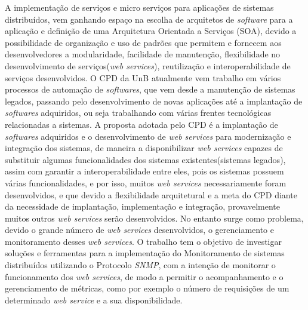 A implementação de serviços e micro serviços para aplicações de sistemas distribuídos, vem ganhando espaço na escolha de arquitetos de \textit{software} para a aplicação e definição de uma Arquitetura Orientada a Serviços (\acrshort{SOA}), devido a possibilidade de organização e uso de padrões que permitem e fornecem aos desenvolvedores a modularidade, facilidade de manutenção, flexibilidade no desenvolvimento de serviços(\textit{web services}), reutilização e interoperabilidade de serviços desenvolvidos. O \acrfull{CPD} da \acrfull{UnB} atualmente vem trabalho em vários processos de automação de \textit{softwares}, que vem desde a manutenção de sistemas legados, passando pelo desenvolvimento de novas aplicações até a implantação de \textit{softwares} adquiridos, ou seja trabalhando com várias frentes tecnológicas relacionadas a sistemas. A proposta adotada pelo \acrshort{CPD} é a implantação de \textit{softwares} adquiridos e o desenvolvimento de \textit{web services} para modernização e integração dos sistemas, de maneira a disponibilizar \textit{web services} capazes de substituir algumas funcionalidades dos sistemas existentes(sistemas legados), assim com garantir a interoperabilidade entre eles, pois os sistemas possuem várias funcionalidades, e por isso, muitos \textit{web services} necessariamente foram desenvolvidos, e que devido a flexibilidade arquitetural e a meta do \acrshort{CPD} diante da necessidade de implantação, implementação e integração, provavelmente muitos outros \textit{web services} serão desenvolvidos. No entanto surge como problema, devido o grande número de \textit{web services} desenvolvidos, o gerenciamento e monitoramento desses \textit{web services}. O trabalho tem o objetivo de investigar soluções e ferramentas para a implementação do Monitoramento de sistemas distribuídos utilizando o Protocolo \textit{\acrfull{SNMP}}, com a intenção de monitorar o funcionamento dos \textit{web services}, de modo a permitir o acompanhamento e o gerenciamento de métricas, como por exemplo o número de requisições de um determinado \textit{web service} e a sua disponibilidade. 